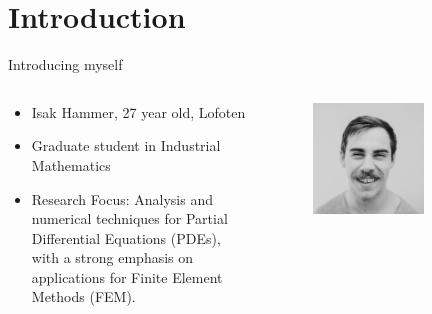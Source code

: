	\section{Introduction}


    \begin{frame}{Introducing myself}
        \begin{columns}
            \begin{column}{0.5\textwidth}
                \begin{itemize}
                    \item Isak Hammer, 27 year old, Lofoten
                    \item Graduate student in Industrial Mathematics
                    \item Research Focus: Analysis and numerical techniques for Partial Differential Equations (PDEs), with a strong emphasis on applications for Finite Element Methods (FEM).
                \end{itemize}
            \end{column}

            \begin{column}{0.5\textwidth}
                \begin{figure}
                    \centering
                    \includegraphics[width=0.7\textwidth]{figures/isak.jpg}
                \end{figure}
            \end{column}
        \end{columns}
    \end{frame}

